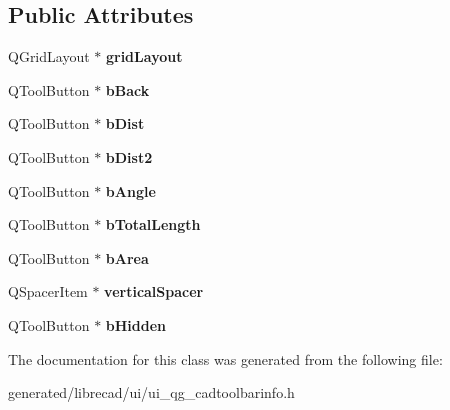 \subsection*{Public Attributes}
\begin{DoxyCompactItemize}
\item 
\hypertarget{classUi__QG__CadToolBarInfo_aa90dd9d453c35fa7c0105baafac3b844}{Q\-Grid\-Layout $\ast$ {\bfseries grid\-Layout}}\label{classUi__QG__CadToolBarInfo_aa90dd9d453c35fa7c0105baafac3b844}

\item 
\hypertarget{classUi__QG__CadToolBarInfo_af0b5606aa2d923705486b1bd01b7f68d}{Q\-Tool\-Button $\ast$ {\bfseries b\-Back}}\label{classUi__QG__CadToolBarInfo_af0b5606aa2d923705486b1bd01b7f68d}

\item 
\hypertarget{classUi__QG__CadToolBarInfo_a8677871c60e3ae282a796b58073919f8}{Q\-Tool\-Button $\ast$ {\bfseries b\-Dist}}\label{classUi__QG__CadToolBarInfo_a8677871c60e3ae282a796b58073919f8}

\item 
\hypertarget{classUi__QG__CadToolBarInfo_a7e59dc3a87c231aabd1ee114e0a0f4e4}{Q\-Tool\-Button $\ast$ {\bfseries b\-Dist2}}\label{classUi__QG__CadToolBarInfo_a7e59dc3a87c231aabd1ee114e0a0f4e4}

\item 
\hypertarget{classUi__QG__CadToolBarInfo_aaf030b0b8a3128b922c007e855f23fc4}{Q\-Tool\-Button $\ast$ {\bfseries b\-Angle}}\label{classUi__QG__CadToolBarInfo_aaf030b0b8a3128b922c007e855f23fc4}

\item 
\hypertarget{classUi__QG__CadToolBarInfo_a42c04f0a6c32b442a96fc1cbe15355d2}{Q\-Tool\-Button $\ast$ {\bfseries b\-Total\-Length}}\label{classUi__QG__CadToolBarInfo_a42c04f0a6c32b442a96fc1cbe15355d2}

\item 
\hypertarget{classUi__QG__CadToolBarInfo_ac8122ce4dcf55da544a70815b0ae3526}{Q\-Tool\-Button $\ast$ {\bfseries b\-Area}}\label{classUi__QG__CadToolBarInfo_ac8122ce4dcf55da544a70815b0ae3526}

\item 
\hypertarget{classUi__QG__CadToolBarInfo_aef80181b5c76497bf04b66e039198562}{Q\-Spacer\-Item $\ast$ {\bfseries vertical\-Spacer}}\label{classUi__QG__CadToolBarInfo_aef80181b5c76497bf04b66e039198562}

\item 
\hypertarget{classUi__QG__CadToolBarInfo_a6645b0e2cd2ece2f726a7870fac0f0fc}{Q\-Tool\-Button $\ast$ {\bfseries b\-Hidden}}\label{classUi__QG__CadToolBarInfo_a6645b0e2cd2ece2f726a7870fac0f0fc}

\end{DoxyCompactItemize}


The documentation for this class was generated from the following file\-:\begin{DoxyCompactItemize}
\item 
generated/librecad/ui/ui\-\_\-qg\-\_\-cadtoolbarinfo.\-h\end{DoxyCompactItemize}
